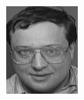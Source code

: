 \begin{frame}
\begin{columns}
\begin{overlayarea}{\textwidth}{\textheight}
      \begin{minipage}[t]{0.15\textwidth}
        \includegraphics[width=\textwidth]{images/celebrity_images/s31_1.jpg}
      \end{minipage}
      \begin{minipage}[t]{0.15\textwidth}

\end{minipage}
\end{overlayarea}
\end{columns}
\end{frame}
